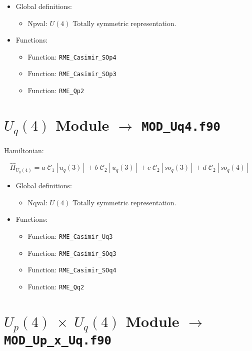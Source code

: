 \documentclass[english,twoside, openright]{report}
\newcommand{\cas}[2]{
  \mathcal{C}_{#1}\left[#2\right]
}
\begin{document}
\begin{itemize}
\item Global definitions:
  \begin{itemize}
  \item Npval: $U(4)$ Totally symmetric representation.
  \end{itemize}
\item Functions:
  \begin{itemize}
  \item Function: \texttt{RME\_Casimir\_SOp4}
  \item Function: \texttt{RME\_Casimir\_SOp3}
  \item Function: \texttt{RME\_Qp2}
  \end{itemize}
\end{itemize}

\section{$U_q(4)$ Module $\rightarrow$ \texttt{MOD\_Uq4.f90}}

Hamiltonian:

\begin{equation}
  \hat{H}_{U_q(4)} = a \; \cas{1}{u_q(3)} + b \; \cas{2}{u_q(3)} + c \; \cas{2}{so_q(3)} + d \; \cas{2}{so_q(4)}
\end{equation}

\begin{itemize}
\item Global definitions:
  \begin{itemize}
  \item Nqval: $U(4)$ Totally symmetric representation.
  \end{itemize}
\item Functions:
  \begin{itemize}
  \item Function: \texttt{RME\_Casimir\_Uq3}
  \item Function: \texttt{RME\_Casimir\_SOq3}
  \item Function: \texttt{RME\_Casimir\_SOq4}
  \item Function: \texttt{RME\_Qq2}
  \end{itemize}
\end{itemize}

\section{$U_p(4)\;\times\;U_q(4)$ Module $\rightarrow$ \texttt{MOD\_Up\_x\_Uq.f90}}
\end{document}
